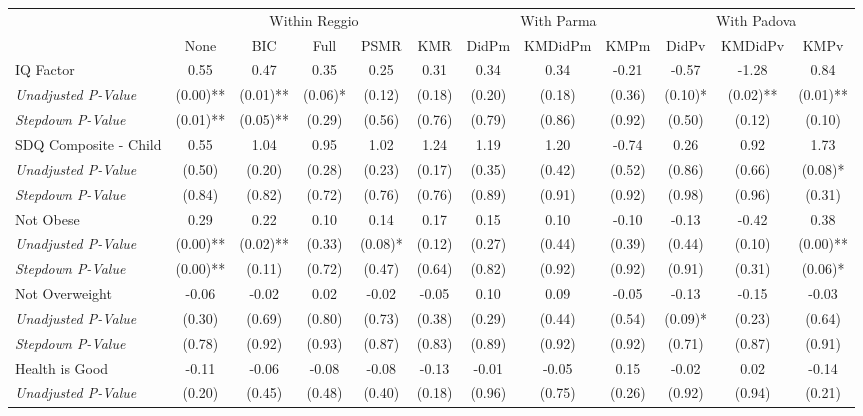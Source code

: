 \begin{tabular}{l c c c c c c c c c c c}
\toprule
& \multicolumn{5}{c}{Within Reggio} & \multicolumn{3}{c}{With Parma} & \multicolumn{3}{c}{With Padova} \\\cmidrule(lr){2-6} \cmidrule(lr){7-9} \cmidrule(lr){10-12}
 & None & BIC & Full & PSMR & KMR & DidPm & KMDidPm & KMPm & DidPv & KMDidPv & KMPv \\
\midrule
IQ Factor & 0.55 & 0.47 & 0.35 & 0.25 & 0.31 & 0.34 & 0.34 & -0.21 & -0.57 & -1.28 & 0.84 \\
\quad \textit{Unadjusted P-Value} & (0.00)** & (0.01)** & (0.06)* & (0.12) & (0.18) & (0.20) & (0.18) & (0.36) & (0.10)* & (0.02)** & (0.01)** \\
\quad \textit{Stepdown P-Value} & (0.01)** & (0.05)** & (0.29) & (0.56) & (0.76) & (0.79) & (0.86) & (0.92) & (0.50) & (0.12) & (0.10) \\
SDQ Composite - Child & 0.55 & 1.04 & 0.95 & 1.02 & 1.24 & 1.19 & 1.20 & -0.74 & 0.26 & 0.92 & 1.73 \\
\quad \textit{Unadjusted P-Value} & (0.50) & (0.20) & (0.28) & (0.23) & (0.17) & (0.35) & (0.42) & (0.52) & (0.86) & (0.66) & (0.08)* \\
\quad \textit{Stepdown P-Value} & (0.84) & (0.82) & (0.72) & (0.76) & (0.76) & (0.89) & (0.91) & (0.92) & (0.98) & (0.96) & (0.31) \\
Not Obese & 0.29 & 0.22 & 0.10 & 0.14 & 0.17 & 0.15 & 0.10 & -0.10 & -0.13 & -0.42 & 0.38 \\
\quad \textit{Unadjusted P-Value} & (0.00)** & (0.02)** & (0.33) & (0.08)* & (0.12) & (0.27) & (0.44) & (0.39) & (0.44) & (0.10) & (0.00)** \\
\quad \textit{Stepdown P-Value} & (0.00)** & (0.11) & (0.72) & (0.47) & (0.64) & (0.82) & (0.92) & (0.92) & (0.91) & (0.31) & (0.06)* \\
Not Overweight & -0.06 & -0.02 & 0.02 & -0.02 & -0.05 & 0.10 & 0.09 & -0.05 & -0.13 & -0.15 & -0.03 \\
\quad \textit{Unadjusted P-Value} & (0.30) & (0.69) & (0.80) & (0.73) & (0.38) & (0.29) & (0.44) & (0.54) & (0.09)* & (0.23) & (0.64) \\
\quad \textit{Stepdown P-Value} & (0.78) & (0.92) & (0.93) & (0.87) & (0.83) & (0.89) & (0.92) & (0.92) & (0.71) & (0.87) & (0.91) \\
Health is Good & -0.11 & -0.06 & -0.08 & -0.08 & -0.13 & -0.01 & -0.05 & 0.15 & -0.02 & 0.02 & -0.14 \\
\quad \textit{Unadjusted P-Value} & (0.20) & (0.45) & (0.48) & (0.40) & (0.18) & (0.96) & (0.75) & (0.26) & (0.92) & (0.94) & (0.21) \\

\end{tabular}
